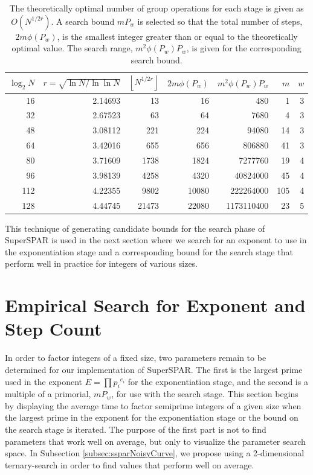 \documentclass{ucalgthes1}
\theoremstyle{definition}
\newcommand{\floor}[1]{\left\lfloor #1 \right\rfloor}
\begin{document}
\begin{table}[htb]
\centering
\begin{tabular}{| r | r | r | r | r | r | r |}
\hline
$\log_2 N$ & $r = \sqrt{\ln N / \ln \ln N}$ & $\floor{N^{1/2r}}$ & $2m\phi(P_w)$ & $m^2\phi(P_w)P_w$ & $m$ & $w$ \\
\hline
16 & 2.14693 & 13 & 16 & 480 & 1 & 3 \\
32 & 2.67523 & 63 & 64 & 7680 & 4 & 3 \\
48 & 3.08112 & 221 & 224 & 94080 & 14 & 3 \\
64 & 3.42016 & 655 & 656 & 806880 & 41 & 3 \\
80 & 3.71609 & 1738 & 1824 & 7277760 & 19 & 4 \\
96 & 3.98139 & 4258 & 4320 & 40824000 & 45 & 4 \\
112 & 4.22355 & 9802 & 10080 & 222264000 & 105 & 4 \\
128 & 4.44745 & 21473 & 22080 & 1173110400 & 23 & 5 \\
\hline
\end{tabular}
\caption[Theoretical Number of Search Steps.]{The theoretically optimal number of group operations for each stage is given as $O(N^{1/2r})$.  A search bound $mP_w$ is selected so that the total number of steps, $2m\phi(P_w)$, is the smallest integer greater than or equal to the theoretically optimal value.  The search range, $m^2\phi(P_w)P_w$, is given for the corresponding search bound.}
\label{tab:theorySteps}
\end{table}

This technique of generating candidate bounds for the search phase of SuperSPAR is used in the next section where we search for an exponent to use in the exponentiation stage and a corresponding bound for the search stage that perform well in practice for integers of various sizes.  


\section{Empirical Search for Exponent and Step Count}
\label{sec:ssparEmpirical}

In order to factor integers of a fixed size, two parameters remain to be determined for our implementation of SuperSPAR.  The first is the largest prime used in the exponent $E = \prod {p_i}^{e_i}$ for the exponentiation stage, and the second is a multiple of a primorial, $mP_w$, for use with the search stage.  This section begins by displaying the average time to factor semiprime integers of a given size when the largest prime in the exponent for the exponentiation stage or the bound on the search stage is iterated.  The purpose of the first part is not to find parameters that work well on average, but only to visualize the parameter search space.  In Subsection \ref{subsec:ssparNoisyCurve}, we propose using a 2-dimensional ternary-search in order to find values that perform well on average. 
\end{document}
